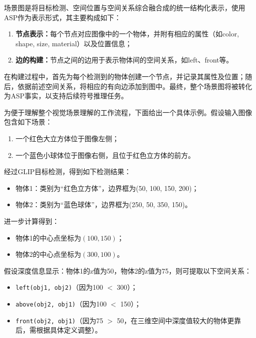 场景图是将目标检测、空间位置与空间关系综合融合成的统一结构化表示，使用ASP作为表示形式，其主要构成如下： 
\begin{enumerate}[nosep] 
    \item \textbf{节点表示：}每个节点对应图像中的一个物体，并附有相应的属性（如color, shape, size, material）以及位置信息； 
    \item \textbf{边的构建：}节点之间的边用于表示物体间的空间关系，如left、front等。 
\end{enumerate}

在构建过程中，首先为每个检测到的物体创建一个节点，并记录其属性及位置；随后，依据前述空间关系，将相应的有向边添加到图中。最终，整个场景图将被转化为ASP事实，以支持后续符号推理任务。

为便于理解整个视觉场景理解的工作流程，下面给出一个具体示例。假设输入图像包含如下场景： 
\begin{enumerate}[nosep] 
    \item 一个红色大立方体位于图像左侧； 
    \item 一个蓝色小球体位于图像右侧，且位于红色立方体的前方。 
\end{enumerate}

经过GLIP目标检测，得到如下检测结果： 
\begin{itemize}[itemsep=0pt,parsep=0pt] 
    \item 物体1：类别为“红色立方体”，边界框为(50, 100, 150, 200)； 
    \item 物体2：类别为“蓝色球体”，边界框为(250, 50, 350, 150)。 
\end{itemize}

进一步计算得到： 
\begin{itemize}[itemsep=0pt,parsep=0pt] 
    \item 物体1的中心点坐标为$(100,150)$； 
    \item 物体2的中心点坐标为$(300,100)$。 
\end{itemize}

假设深度信息显示：物体1的z值为50，物体2的z值为75，则可提取以下空间关系： 
\begin{itemize}[itemsep=0pt,parsep=0pt] 
    \item \texttt{left(obj1, obj2)}（因为100 $<$ 300）； 
    \item \texttt{above(obj2, obj1)}（因为100 $<$ 150）； 
    \item \texttt{front(obj2, obj1)}（因为75 $>$ 50，在三维空间中深度值较大的物体更靠后，需根据具体定义调整）。 
\end{itemize}

